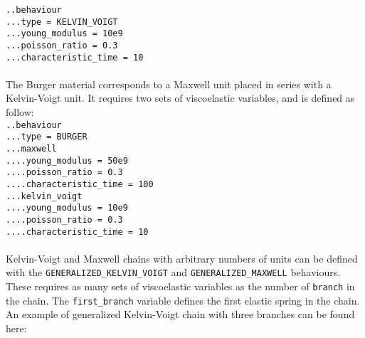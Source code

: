 \documentclass[10pt]{article}
\begin{document}
\noindent \verb+..behaviour+\\
\verb+...type = KELVIN_VOIGT+\\
\verb+...young_modulus = 10e9+\\
\verb+...poisson_ratio = 0.3+\\
\verb+...characteristic_time = 10+

\paragraph{} The Burger material corresponds to a Maxwell unit placed in series with a Kelvin-Voigt unit. It requires two sets of viscoelastic variables, and is defined as follow:\\

\noindent \verb+..behaviour+\\
\verb+...type = BURGER+\\
\verb+...maxwell+\\
\verb+....young_modulus = 50e9+\\
\verb+....poisson_ratio = 0.3+\\
\verb+....characteristic_time = 100+\\
\verb+...kelvin_voigt+\\
\verb+....young_modulus = 10e9+\\
\verb+....poisson_ratio = 0.3+\\
\verb+....characteristic_time = 10+

\paragraph{} Kelvin-Voigt and Maxwell chains with arbitrary numbers of units can be defined with the \verb+GENERALIZED_KELVIN_VOIGT+ and \verb+GENERALIZED_MAXWELL+ behaviours. These requires as many sets of viscoelastic variables as the number of \verb+branch+ in the chain. The \verb+first_branch+ variable defines the first elastic spring in the chain. An example of generalized Kelvin-Voigt chain with three branches can be found here:\\
\end{document}
